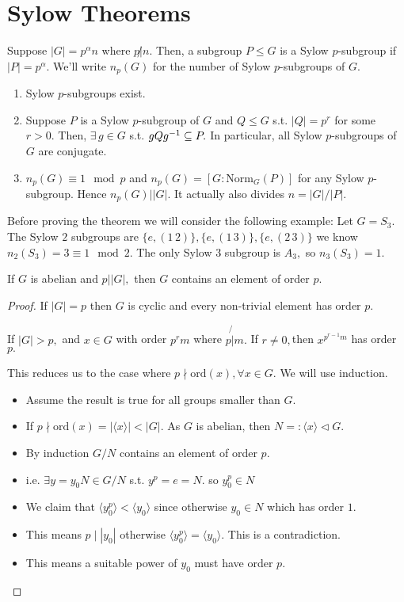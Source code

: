 \documentclass[a4paper]{article}
\begin{document}
\section{Sylow Theorems}
\begin{theorem}
    Suppose $|G|=p^\alpha n$ where $p\not|n.$ Then, a subgroup $P\leq G$ is a Sylow $p$-subgroup if $|P|=p^\alpha.$ We'll write $n_p(G)$ for the number of Sylow $p$-subgroups of $G.$ \begin{enumerate}
        \item Sylow $p$-subgroups exist.
        \item Suppose $P$ is a Sylow $p$-subgroup of $G$ and $Q\leq G$ s.t. $|Q|=p^r$ for some $r>0.$ Then, $\exists\,g\in G$ s.t. $gQg^{-1}\subseteq P.$ In particular, all Sylow $p$-subgroups of $G$ are conjugate. 
        \item $n_p(G)\equiv1\mod{p}$ and $n_p(G)=[G:\mathrm{Norm}_G(P)]$ for any Sylow $p$-subgroup. Hence $n_p(G)||G|.$ It actually also divides $n=|G|/|P|.$
    \end{enumerate}
\end{theorem}
Before proving the theorem we will consider the following example: Let $G=S_3.$ The Sylow $2$ subgroups are $\{e,(1\,2)\},\{e,(1\,3)\},\{e,(2\,3)\}$ we know $n_2(S_3)=3\equiv1\mod2.$ The only Sylow $3$ subgroup is $A_3,$ so $n_3(S_3)=1.$\begin{lemma}
    If $G$ is abelian and $p\Big||G|,$ then $G$ contains an element of order $p.$
    \begin{proof}
        If $|G|=p$ then $G$ is cyclic and every non-trivial element has order $p$.

        If $|G|>p,$ and $x\in G$ with order $p^rm$ where $p\not{\big|}m.$ If $r\neq0,$then $x^{p^{r-1}m}$ has order $p.$
        
        This reduces us to the case where $p\nmid\mathrm{ord}(x), \forall x\in G.$ We will use induction. \begin{itemize}
            \item Assume the result is true for all groups smaller than $G.$ 
            \item If $p\nmid\mathrm{ord}(x)=|\langle x\rangle|<|G|.$ As $G$ is abelian, then $N=:\langle x\rangle\triangleleft G.$ 
            \item By induction $G/N$ contains an element of order $p.$
            \item i.e. $\exists y=y_0N\in G/N$ s.t. $y^p=e=N.$ so $y_0^p\in N$
            \item We claim that $\langle y_0^p\rangle<\langle y_0\rangle$ since otherwise $y_0\in N$ which has order $1.$
            \item This means $p\mid|y_0|$ otherwise $\langle y_0^p\rangle=\langle y_0\rangle.$ This is a contradiction.
            \item This means a suitable power of $y_0$ must have order $p.$
        \end{itemize}
    \end{proof}
\end{lemma}
\end{document}
